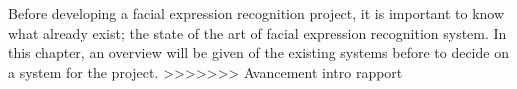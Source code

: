 Before developing a facial expression recognition project, it is important to know what already exist; the state of the art of facial expression recognition system. In this chapter, an overview will be given of the existing systems before to decide on a system for the project.
>>>>>>> Avancement intro rapport
